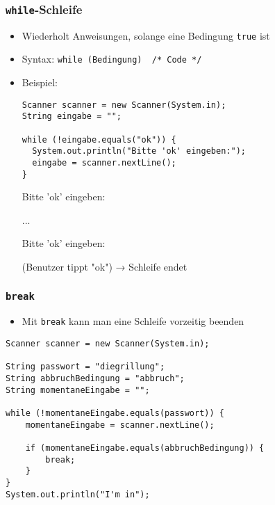 \documentclass{../../presentation}
\begin{document}
\begin{frame}[fragile]
  \frametitle{\texttt{while}-Schleife}

  \begin{itemize}
    \item<1-> Wiederholt Anweisungen, solange eine Bedingung \texttt{true} ist
    \item<1-> Syntax: \texttt{while (Bedingung) { /* Code */ }}
    \item<2-> Beispiel:
          \begin{verbatim}
Scanner scanner = new Scanner(System.in);
String eingabe = "";

while (!eingabe.equals("ok")) {
  System.out.println("Bitte 'ok' eingeben:");
  eingabe = scanner.nextLine();
}
      \end{verbatim}

          \begin{ausgabe}
            Bitte 'ok' eingeben:

            ...

            Bitte 'ok' eingeben:

            (Benutzer tippt "ok") → Schleife endet

          \end{ausgabe}

  \end{itemize}

\end{frame}


\begin{frame}[fragile]
  \frametitle{\texttt{break}}

  \begin{itemize}
    \item Mit \texttt{break} kann man eine Schleife vorzeitig beenden
  \end{itemize}

  \begin{verbatim}
Scanner scanner = new Scanner(System.in);

String passwort = "diegrillung";
String abbruchBedingung = "abbruch";
String momentaneEingabe = "";

while (!momentaneEingabe.equals(passwort)) {
    momentaneEingabe = scanner.nextLine();

    if (momentaneEingabe.equals(abbruchBedingung)) {
        break;
    }
}
System.out.println("I'm in");
\end{verbatim}
\end{frame}
\end{document}
